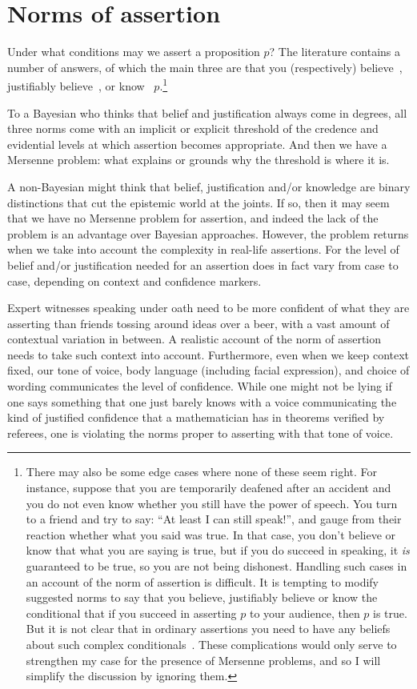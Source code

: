 \section{Norms of assertion}
Under what conditions may we assert a proposition $p$? The literature contains a number of answers, of which the main 
three are that you (respectively) believe~\parencite{Bach2008}, justifiably believe~\parencite{Kvanvig2009}, or know~\parencite{WilliamsonKn} $p$.\footnote{There may also be some edge cases where none 
of these seem right. For instance, suppose that you are temporarily deafened after an accident and you do not even know whether 
you still have the power of speech. You turn to a friend and try to say: ``At least I can still speak!'', and gauge from 
their reaction whether what you said was true. In that case, you don't believe or know that what you are saying is true, but 
if you do succeed in speaking, it \textit{is} guaranteed to be true, so you are not being dishonest. Handling such cases in 
an account of the norm of assertion is difficult. It is tempting to modify suggested norms to say that you believe, 
justifiably believe or know the conditional that if you succeed in asserting $p$ to your audience, then $p$ is true. But it is 
not clear that in ordinary assertions you need to have any beliefs about such complex conditionals~\parencite{PrussLying}. These complications
would only serve to strengthen my case for the presence of Mersenne problems, and so I will simplify the discussion by ignoring them.}

To a Bayesian who thinks that belief and justification always come in degrees, all three norms come with an implicit or 
explicit threshold of the credence and evidential levels at which assertion becomes appropriate. And then we have a 
Mersenne problem: what explains or grounds why the threshold is where it is.

A non-Bayesian might think that belief, justification and/or knowledge are binary distinctions that cut the epistemic 
world at the joints. If so, then it may seem that we have no Mersenne problem for assertion, and indeed the lack of the 
problem is an advantage over Bayesian approaches. However, the problem returns when we take into account the complexity
in real-life assertions. For the level of belief and/or justification needed for an assertion does in fact vary from case to 
case, depending on context and confidence markers. 

Expert witnesses speaking under oath need to be more confident of what they are asserting than friends tossing around 
ideas over a beer, with a vast amount of contextual variation in between. A realistic account of the norm of assertion 
needs to take such context into account. Furthermore, even when we keep context fixed, our tone of voice, body language (including
facial expression), and choice of wording communicates the level of confidence. While one might not be lying if one says something that one 
just barely knows with a voice communicating the kind of justified confidence that a mathematician has in theorems verified
by referees, one is violating the norms proper to asserting with that tone of voice. 

